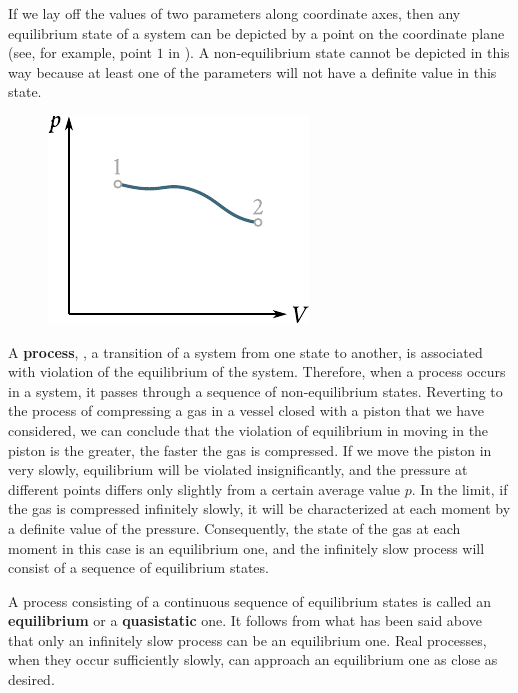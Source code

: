 If we lay off the values of two parameters along coordinate axes, then any equilibrium state of a system can be depicted by a point on the coordinate plane (see, for example, point $1$ in ). A non-equilibrium state cannot be depicted in this way because at least one of the parameters will not have a definite value in this state.

\begin{figure}[t]
	\begin{center}
		\includegraphics[scale=1.0]{figures/ch_10/fig_10_1.pdf}
		\caption[]{}
		\label{fig:10_1}
	\end{center}
	\vspace{-0.8cm}
\end{figure}

A \textbf{process}, \ie, a transition of a system from one state to another, is associated with violation of the equilibrium of the system. Therefore, when a process occurs in a system, it passes through a sequence of non-equilibrium states. Reverting to the process of compressing a gas in a vessel closed with a piston that we have considered, we can conclude that the violation of equilibrium in moving in the piston is the greater, the faster the gas is compressed. If we move the piston in very slowly, equilibrium will be violated insignificantly, and the pressure at different points differs only slightly from a certain average value $p$. In the limit, if the gas is compressed infinitely slowly, it will be characterized at each moment by a definite value of the pressure. Consequently, the state of the gas at each moment in this case is an equilibrium one, and the infinitely slow process will consist of a sequence of equilibrium states.

A process consisting of a continuous sequence of equilibrium states is called an \textbf{equilibrium} or a \textbf{quasistatic} one. It follows from what has been said above that only an infinitely slow process can be an equilibrium one. Real processes, when they occur sufficiently slowly, can approach an equilibrium one as close as desired.

